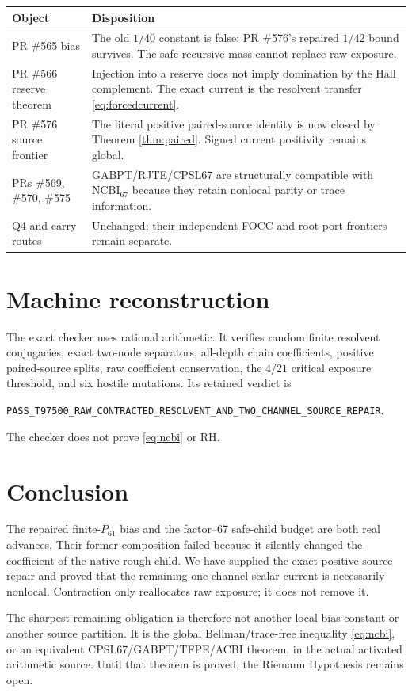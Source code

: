 \documentclass[11pt]{article}
\newcommand{\1}{\mathbf 1}
\newcommand{\NCBI}{\mathrm{NCBI}_{67}}
\begin{document}
\begin{longtable}{p{}p{}}
\toprule
Object & Disposition \\
\midrule
PR \#565 bias & The old $1/40$ constant is false; PR \#576's repaired $1/42$
bound survives.  The safe recursive mass cannot replace raw exposure.\\
PR \#566 reserve theorem & Injection into a reserve does not imply domination
by the Hall complement.  The exact current is the resolvent transfer
\eqref{eq:forcedcurrent}.\\
PR \#576 source frontier & The literal positive paired-source identity is now
closed by Theorem \ref{thm:paired}.  Signed current positivity remains global.\\
PRs \#569, \#570, \#575 & GABPT/RJTE/CPSL67 are structurally compatible with
$\NCBI$ because they retain nonlocal parity or trace information.\\
Q4 and carry routes & Unchanged; their independent FOCC and root-port frontiers
remain separate.\\
\bottomrule
\end{longtable}

\section{Machine reconstruction}

The exact checker uses rational arithmetic.  It verifies random finite
resolvent conjugacies, exact two-node separators, all-depth chain coefficients,
positive paired-source splits, raw coefficient conservation, the $4/21$
critical exposure threshold, and six hostile mutations.  Its retained verdict
is
\begin{center}
\texttt{PASS\_T97500\_RAW\_CONTRACTED\_RESOLVENT\_AND\_TWO\_CHANNEL\_SOURCE\_REPAIR}.
\end{center}
The checker does not prove \eqref{eq:ncbi} or RH.

\section{Conclusion}

The repaired finite-$P_{61}$ bias and the factor--67 safe-child budget are both
real advances.  Their former composition failed because it silently changed
the coefficient of the native rough child.  We have supplied the exact positive
source repair and proved that the remaining one-channel scalar current is
necessarily nonlocal.  Contraction only reallocates raw exposure; it does not
remove it.

The sharpest remaining obligation is therefore not another local bias constant
or another source partition.  It is the global Bellman/trace-free inequality
\eqref{eq:ncbi}, or an equivalent CPSL67/GABPT/TFPE/ACBI theorem, in the actual
activated arithmetic source.  Until that theorem is proved, the Riemann
Hypothesis remains open.
\end{document}
